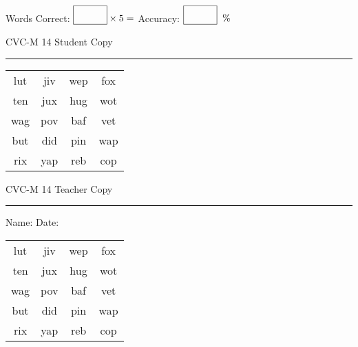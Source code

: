 \documentclass{memoir}
\begin{document}
\small

Words Correct: $\fbox{\phantom{\huge 100}} \times 5 = $ Accuracy: $\fbox{\phantom{\huge 100}}\;\; \%$ 

\vfill

\newpage


\footnotesize \noindent
CVC-M 14 \hfill Student Copy
\smallskip
\hrule

\Large

\setlength{\tabcolsep}{14pt}
\def\arraystretch{2}

{\selectfont


\begin{vplace}[0.5]
\begin{center}
\begin{tabular}{cccc}
lut & jiv & wep & fox \\
ten & jux & hug & wot \\
wag & pov & baf & vet \\
but & did & pin & wap \\
rix & yap & reb & cop \\
\end{tabular}
\end{center}
\end{vplace}

}

\newpage

\footnotesize \noindent
CVC-M 14 \hfill Teacher Copy
\smallskip
\hrule

\small

\vfill

\noindent
Name: \underline{\hspace{1.75in}} \hfill Date: \underline{\hspace{1in}}

\Large

{\selectfont


\begin{vplace}[0.5]
\begin{center}
\begin{tabular}{cccc}
lut & jiv & wep & fox \\
ten & jux & hug & wot \\
wag & pov & baf & vet \\
but & did & pin & wap \\
rix & yap & reb & cop \\
\end{tabular}
\end{center}
\end{vplace}



}
\end{document}
